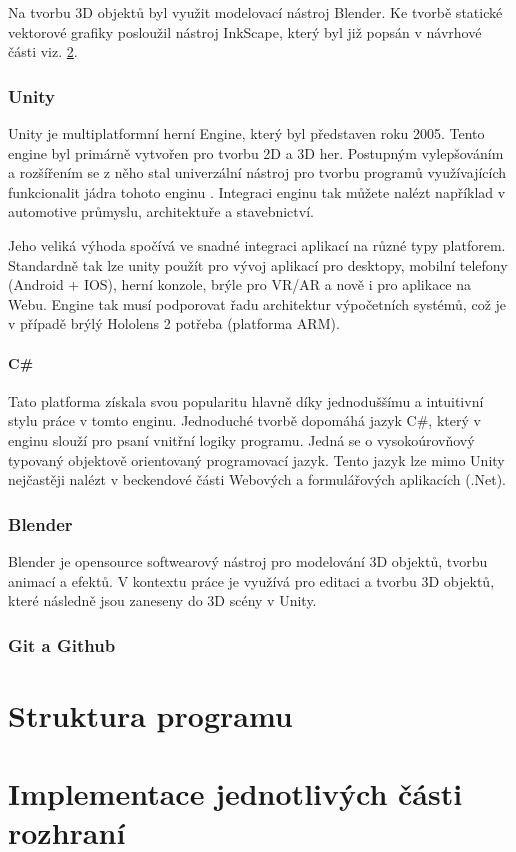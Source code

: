 Na tvorbu 3D objektů byl využit modelovací nástroj Blender. Ke tvorbě statické vektorové grafiky posloužil nástroj InkScape, který byl již popsán v návrhové části viz. \ref{}.  
\subsubsection{Unity}
Unity je multiplatformní herní Engine, který byl představen roku 2005. Tento engine byl primárně vytvořen pro tvorbu 2D a 3D her. Postupným vylepšováním a rozšířením se z něho stal univerzální nástroj pro tvorbu programů využívajících funkcionalit jádra tohoto enginu . Integraci enginu tak můžete nalézt například v automotive průmyslu, architektuře a stavebnictví.  

Jeho veliká výhoda spočívá ve snadné integraci aplikací na různé typy platforem. Standardně tak lze unity použít pro vývoj aplikací pro desktopy, mobilní telefony (Android + IOS), herní konzole, brýle pro VR/AR a nově i pro aplikace na Webu. Engine tak musí podporovat řadu architektur výpočetních systémů, což je v případě brýlý Hololens 2 potřeba (platforma ARM). 
\paragraph{C\#}
Tato platforma získala svou popularitu hlavně díky jednoduššímu a intuitivní stylu práce v tomto enginu. Jednoduché tvorbě dopomáhá jazyk C\#, který v enginu slouží pro psaní vnitřní logiky programu. Jedná se o vysokoúrovňový typovaný objektově orientovaný programovací jazyk. Tento jazyk lze mimo Unity nejčastěji nalézt v beckendové části Webových a formulářových aplikacích (.Net). 
\subsubsection{Blender}
Blender je opensource softwearový nástroj pro modelování 3D objektů, tvorbu animací a efektů. V kontextu práce je využívá pro editaci a tvorbu 3D objektů, které následně jsou zaneseny do 3D scény v Unity. 
\subsubsection{Git a Github}

\newpage
\section{Struktura programu}

\newpage
\section{Implementace jednotlivých části rozhraní}

